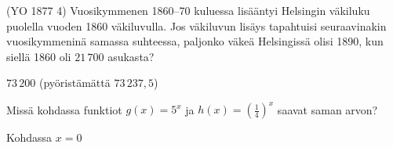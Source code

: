 \begin{multicols}{2}
\begin{tehtava}
(YO 1877 4) Vuosikymmenen 1860--70 kuluessa lisääntyi Helsingin väkiluku puolella vuoden 1860 väkiluvulla. Jos väkiluvun lisäys tapahtuisi seuraavinakin vuosikymmeninä samassa suhteessa, paljonko väkeä Helsingissä olisi 1890, kun siellä 1860 oli $21\,700$ asukasta? 
	\begin{vastaus}
	$73\,200$ (pyöristämättä $73\,237,5$)
	\end{vastaus}
\end{tehtava}

\begin{tehtava}
Missä kohdassa funktiot $ g(x)=5^{x} $ ja $ h(x)=(\frac{1}{4})^{x} $ saavat saman arvon?
\begin{vastaus}
Kohdassa $x=0$
\end{vastaus}
\end{tehtava}

\end{multicols}
\newpage
